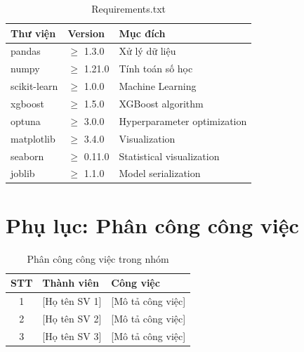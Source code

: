 \documentclass[12pt,a4paper]{article}
\begin{document}
\begin{table}[H]
\centering
\caption{Requirements.txt}
\label{tab:requirements}
\begin{tabular}{|l|l|p{6cm}|}
\hline
\textbf{Thư viện} & \textbf{Version} & \textbf{Mục đích} \\
\hline
pandas & $\geq$ 1.3.0 & Xử lý dữ liệu \\
\hline
numpy & $\geq$ 1.21.0 & Tính toán số học \\
\hline
scikit-learn & $\geq$ 1.0.0 & Machine Learning \\
\hline
xgboost & $\geq$ 1.5.0 & XGBoost algorithm \\
\hline
optuna & $\geq$ 3.0.0 & Hyperparameter optimization \\
\hline
matplotlib & $\geq$ 3.4.0 & Visualization \\
\hline
seaborn & $\geq$ 0.11.0 & Statistical visualization \\
\hline
joblib & $\geq$ 1.1.0 & Model serialization \\
\hline
\end{tabular}
\end{table}

\section{Phụ lục: Phân công công việc}

\begin{table}[H]
\centering
\caption{Phân công công việc trong nhóm}
\label{tab:task_assignment}
\begin{tabular}{|c|l|p{6cm}|}
\hline
\textbf{STT} & \textbf{Thành viên} & \textbf{Công việc} \\
\hline
1 & [Họ tên SV 1] & [Mô tả công việc] \\
\hline
2 & [Họ tên SV 2] & [Mô tả công việc] \\
\hline
3 & [Họ tên SV 3] & [Mô tả công việc] \\
\hline
\end{tabular}
\end{table}
\end{document}
